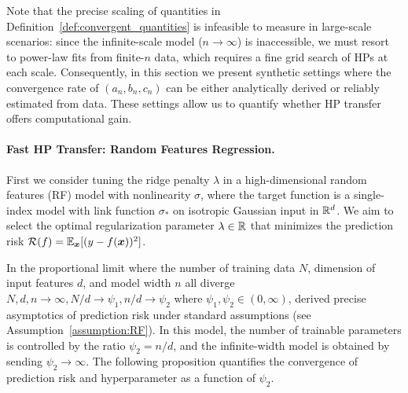 Note that the precise scaling of quantities in Definition~\ref{def:convergent_quantities} is infeasible to measure in large-scale scenarios: since the infinite-scale model ($n\to\infty$) is inaccessible, we must resort to power-law fits from finite-$n$ data, which requires a fine grid search of HPs at each scale. Consequently, in this section we present synthetic settings where the convergence rate of $(a_n,b_n,c_n)$ can be either analytically derived or reliably estimated from data. These settings allow us to quantify whether HP transfer offers computational gain. 


\paragraph{Fast HP Transfer: Random Features Regression.} First we consider tuning the ridge penalty $\lambda$ in a high-dimensional random features (RF) model with nonlinearity $\sigma$, where the target function is a single-index model with link function $\sigma_*$ on isotropic Gaussian input in $\mathbb{R}^d$. We aim to select the optimal regularization parameter $\lambda\in\mathbb{R}$ that minimizes the prediction risk $\mathcal{R}(f) = \mathbb{E}_{{\boldsymbol x}} [(y - f({\boldsymbol x}))^2]$. 

In the proportional limit where the number of training data $N$, dimension of input features $d$, and model width $n$ all diverge $N,d,n\to\infty, N/d\to\psi_1, n/d\to\psi_2$ where $\psi_1,\psi_2\in (0,\infty)$, \cite{mei2022generalization,gerace2020generalisation} derived precise asymptotics of prediction risk under standard assumptions (see Assumption~\ref{assumption:RF}). In this model, the number of trainable parameters is controlled by the ratio $\psi_2=n/d$, and the infinite-width model is obtained by sending $\psi_2\to\infty$. The following proposition quantifies the convergence of prediction risk and hyperparameter as a function of $\psi_2$. 

